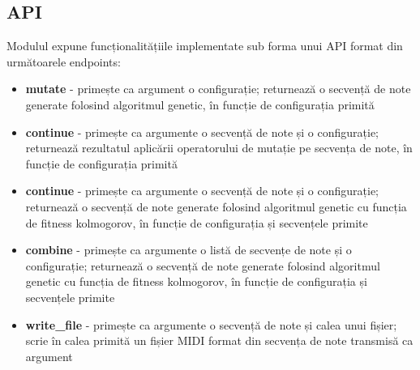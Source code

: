     \subsection{API}
        \noindent Modulul expune funcționalitățiile implementate sub forma unui API format din următoarele endpoints: \par
            \begin{itemize}
                \item \textbf{mutate} - primește ca argument o configurație; returnează o secvență de note generate folosind algoritmul genetic, în funcție de configurația primită 
                \item \textbf{continue} - primește ca argumente o secvență de note și o configurație; returnează rezultatul aplicării operatorului de mutație pe secvența de note, în funcție de configurația primită
                \item \textbf{continue} - primește ca argumente o secvență de note și o configurație; returnează o secvență de note generate folosind algoritmul genetic cu funcția de fitness kolmogorov, în funcție de configurația și secvențele primite
                \item \textbf{combine} - primește ca argumente o listă de secvențe de note și o configurație; returnează o secvență de note generate folosind algoritmul genetic cu funcția de fitness kolmogorov, în funcție de configurația și secvențele primite
                \item \textbf{write\_file} - primește ca argumente o secvență de note și calea unui fișier; scrie în calea primită un fișier MIDI format din secvența de note transmisă ca argument
            \end{itemize}